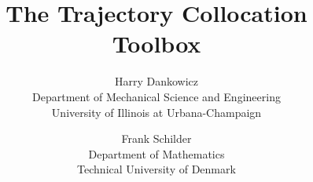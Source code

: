 \documentclass[final,12pt]{article}
\begin{document}
\lstset{language=coco}

\title{The Trajectory Collocation Toolbox}

\author{Harry Dankowicz \\ Department of Mechanical Science and Engineering \\
University of Illinois at Urbana-Champaign \and
Frank Schilder \\ Department of Mathematics \\
Technical University of Denmark}

\maketitle

\tableofcontents
\newpage

\end{document}
